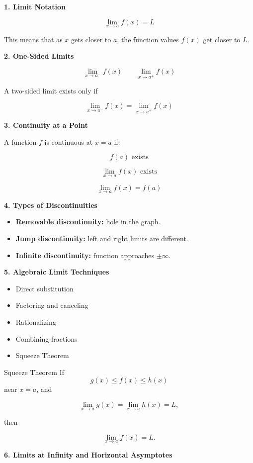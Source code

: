 \documentclass[11pt]{article}
\newcommand{\subtopic}[1]{
\vspace{0.45em}
\textcolor{novelPurpleDark}{\textbf{#1}}
}
\begin{document}
\subtopic{1. Limit Notation}

\[
\lim_{x\to a} f(x)=L
\]

This means that as \(x\) gets closer to \(a\), the function values \(f(x)\) get closer to \(L\).

\subtopic{2. One-Sided Limits}

\[
\lim_{x\to a^-}f(x)
\qquad
\lim_{x\to a^+}f(x)
\]

A two-sided limit exists only if

\[
\lim_{x\to a^-}f(x)=\lim_{x\to a^+}f(x)
\]

\subtopic{3. Continuity at a Point}

A function \(f\) is continuous at \(x=a\) if:

\[
f(a)\text{ exists}
\]

\[
\lim_{x\to a}f(x)\text{ exists}
\]

\[
\lim_{x\to a}f(x)=f(a)
\]

\subtopic{4. Types of Discontinuities}

\begin{itemize}[leftmargin=1.5em]
\item \textbf{Removable discontinuity:} hole in the graph.
\item \textbf{Jump discontinuity:} left and right limits are different.
\item \textbf{Infinite discontinuity:} function approaches \(\pm\infty\).
\end{itemize}

\subtopic{5. Algebraic Limit Techniques}

\begin{itemize}[leftmargin=1.5em]
\item Direct substitution
\item Factoring and canceling
\item Rationalizing
\item Combining fractions
\item Squeeze Theorem
\end{itemize}

\begin{formulabox}{Squeeze Theorem}
If
\[
g(x)\le f(x)\le h(x)
\]
near \(x=a\), and

\[
\lim_{x\to a}g(x)=\lim_{x\to a}h(x)=L,
\]

then

\[
\lim_{x\to a}f(x)=L.
\]
\end{formulabox}

\subtopic{6. Limits at Infinity and Horizontal Asymptotes}
\end{document}
